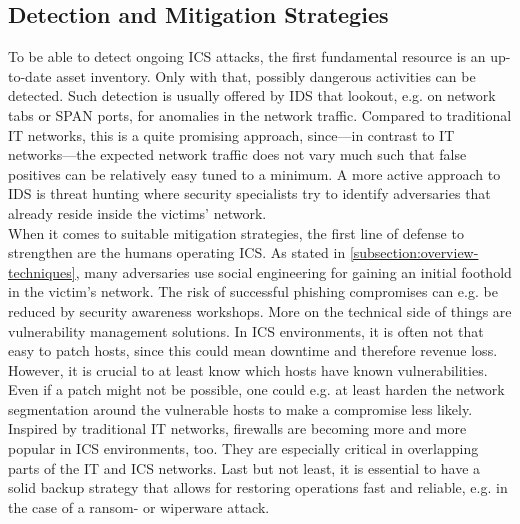 \documentclass[runningheads]{llncs}
\begin{document}
\subsection{Detection and Mitigation Strategies}
\label{subsection:overview-mitigation}
To be able to detect ongoing ICS attacks, the first fundamental resource is an up-to-date asset inventory.
Only with that, possibly dangerous activities can be detected.
Such detection is usually offered by IDS that lookout, e.g. on network tabs or SPAN ports, for anomalies in the network traffic.
Compared to traditional IT networks, this is a quite promising approach, since---in contrast to IT networks---the expected network traffic does not vary much such that false positives can be relatively easy tuned to a minimum.
A more active approach to IDS is threat hunting where security specialists try to identify adversaries that already reside inside the victims' network.\\
When it comes to suitable mitigation strategies, the first line of defense to strengthen are the humans operating ICS.
As stated in \autoref{subsection:overview-techniques}, many adversaries use social engineering for gaining an initial foothold in the victim's network.
The risk of successful phishing compromises can e.g. be reduced by security awareness workshops.
More on the technical side of things are vulnerability management solutions.
In ICS environments, it is often not that easy to patch hosts, since this could mean downtime and therefore revenue loss.
However, it is crucial to at least know which hosts have known vulnerabilities.
Even if a patch might not be possible, one could e.g. at least harden the network segmentation around the vulnerable hosts to make a compromise less likely.
Inspired by traditional IT networks, firewalls are becoming more and more popular in ICS environments, too.
They are especially critical in overlapping parts of the IT and ICS networks.
Last but not least, it is essential to have a solid backup strategy that allows for restoring operations fast and reliable, e.g. in the case of a ransom- or wiperware attack.
\end{document}
